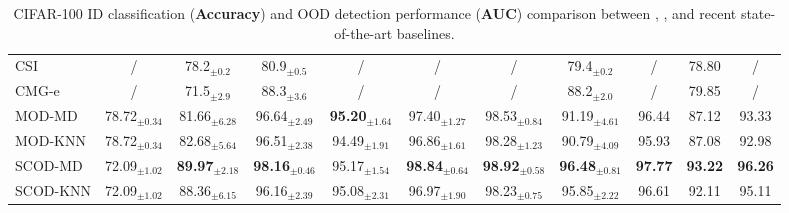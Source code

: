 \begin{table}[h!]
{\begin{tabular}{|l|c|cccccc|ccc|}
CSI   & / & 78.2$_{\pm 0.2}$  & 80.9$_{\pm 0.5}$   & /   & /   & / & \multicolumn{1}{c|}{79.4$_{\pm 0.2}$} & /& 78.80 &   /   \\  
CMG-e & /    & 71.5$_{\pm 2.9}$  & 88.3$_{\pm 3.6}$ & /  & /   & /  & \multicolumn{1}{c|}{88.2$_{\pm 2.0}$} & / & 79.85   &  / \\ \hline
MOD-MD & 78.72$_{\pm 0.34}$ & 81.66$_{\pm 6.28}$ & 96.64$_{\pm 2.49}$ & \textbf{95.20}$_{\pm 1.64}$ & 97.40$_{\pm 1.27}$ & 98.53$_{\pm 0.84}$ & \multicolumn{1}{c|}{91.19$_{\pm 4.61}$} & 96.44 & 87.12  &  93.33  \\ 
MOD-KNN & 78.72$_{\pm 0.34}$ & 82.68$_{\pm 5.64}$ & 96.51$_{\pm 2.38}$ & 94.49$_{\pm 1.91}$ & 96.86$_{\pm 1.61}$ & 98.28$_{\pm 1.23}$ & \multicolumn{1}{c|}{90.79$_{\pm 4.09}$} & 95.93 & 87.08  &  92.98  \\ \hline
SCOD-MD & 72.09$_{\pm 1.02}$ &  \textbf{89.97}$_{\pm 2.18}$ & \textbf{98.16}$_{\pm 0.46}$ & 95.17$_{\pm 1.54}$ & \textbf{98.84}$_{\pm 0.64}$ & \textbf{98.92}$_{\pm 0.58}$ & \textbf{96.48}$_{\pm 0.81}$ & \textbf{97.77} & \textbf{93.22} &  \textbf{96.26} \\ 
SCOD-KNN & 72.09$_{\pm 1.02}$ & 88.36$_{\pm 6.15}$ & 96.16$_{\pm 2.39}$ & 95.08$_{\pm 2.31}$ & 96.97$_{\pm 1.90}$ & 98.23$_{\pm 0.75}$ & 95.85$_{\pm 2.22}$ & 96.61 & 92.11 &  95.11 \\ \hline
\end{tabular}
}
\caption{CIFAR-100 ID classification (\textbf{Accuracy}) and OOD detection performance (\textbf{AUC}) comparison between \sysc, \sysa, and recent state-of-the-art baselines. 
}
\label{tab:propwork-scod-results-cifar100}
\end{table}

